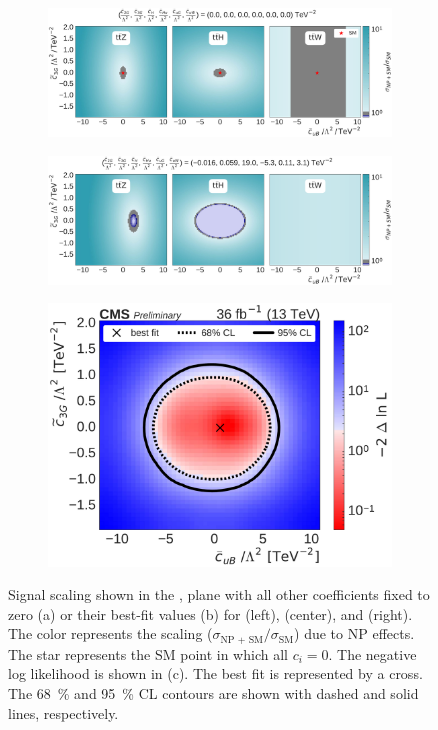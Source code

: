 \begin{figure}
  \vspace{-1cm}
  \begin{subfigure}{\linewidth}
    \centering
    \includegraphics[width=\linewidth]{figures/thirteen-TeV/scaling-frozen/cuB_tc3G}
    \caption{}
  \end{subfigure}
  \begin{subfigure}{\linewidth}
    \centering
    \includegraphics[width=\linewidth]{figures/thirteen-TeV/scaling/cuB_tc3G}
    \caption{}
  \end{subfigure}
  \begin{subfigure}{\linewidth}
    \centering
    \includegraphics[width=0.6\linewidth]{figures/thirteen-TeV/nll/cuB_tc3G}
    \caption{}
  \end{subfigure}
  \vspace{-1cm}
  \setlength{\capwidth}{15cm}
  \caption[Signal scaling and profile likelihood scan in the \cuB, \tcthreeG plane]{Signal scaling
  shown in the \cuB, \tcthreeG plane with all other coefficients fixed to zero (a) or their best-fit
  values (b) for \ttZ (left), \ttH (center), and \ttW (right). The color represents the scaling
  ($\sigma_\text{NP + SM} / \sigma_\text{SM}$) due to NP effects. The star represents the SM point in
  which all $c_i=0$. The negative log likelihood is shown in (c). The best fit is represented by a
  cross. The \SI{68}{\percent} and \SI{95}{\percent} CL contours are shown with dashed and solid
  lines, respectively.}
\end{figure}

